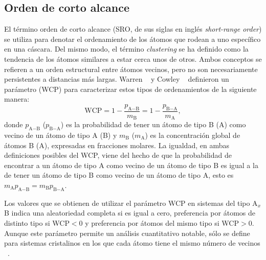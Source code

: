 \subsection{Orden de corto alcance}

El término orden de corto alcance (SRO, de sus siglas en inglés 
\textit{short-range order}) se utiliza para denotar el ordenamiento de los átomos
que rodean a uno específico en una cáscara. Del mismo modo, el término 
\textit{clustering} se ha definido como la tendencia de los átomos similares a 
estar cerca unos de otros. Ambos conceptos se refieren a un orden estructural 
entre átomos vecinos, pero no son necesariamente persistentes a distancias más 
largas. Warren ~\cite{warren69} y Cowley ~\cite{cowley1950} definieron un 
parámetro (WCP) para caracterizar estos tipos de ordenamientos de la siguiente 
manera:
\begin{equation}
    \text{WCP} = 1 - \frac{p_{\text{A}-\text{B}}}{m_\text{B}} = 1 - \frac{p_{\text{B}-\text{A}}}{m_\text{A}},
\end{equation}
donde $p_{\text{A}-\text{B}}$ ($p_{\text{B}-\text{A}}$) es la probabilidad de tener un átomo de tipo B (A) como
vecino de un átomo de tipo A (B) y $m_\text{B}$ ($m_\text{A}$) es la concentración global de átomos
B (A), expresadas en fracciones molares. La igualdad, en ambas definiciones 
posibles del WCP, viene del hecho de que la probabilidad de encontrar a un átomo 
de tipo A como vecino de un átomo de tipo B es igual a la de tener un átomo de 
tipo B como vecino de un átomo de tipo A, esto es $m_\text{A} p_{\text{A}-\text{B}} = m_\text{B} p_{\text{B}-\text{A}}$.

Los valores que se obtienen de utilizar el parámetro WCP en sistemas del tipo
A$_x$B indica una aleatoriedad completa si es igual a cero, preferencia por 
átomos de distinto tipo si WCP$ < 0$ y preferencia por átomos del mismo tipo si 
WCP$ > 0$. Aunque este parámetro permite un análisis cuantitativo notable, sólo
se define para sistemas cristalinos en los que cada átomo tiene el mismo número
de vecinos ~\cite{warren69}.

